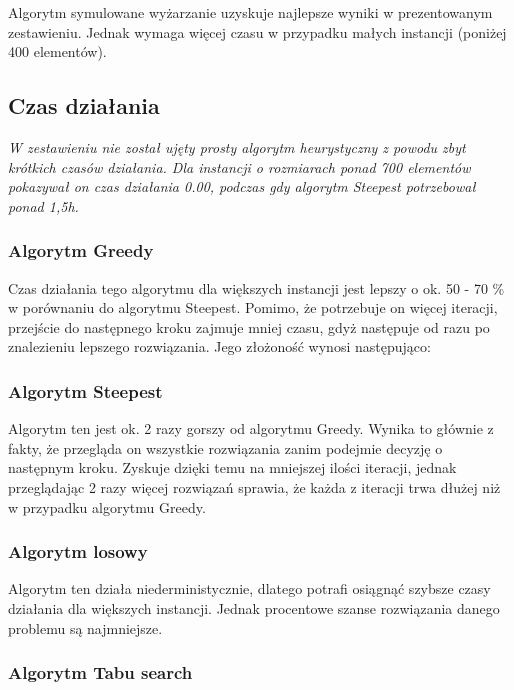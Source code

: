 Algorytm symulowane wyżarzanie uzyskuje najlepsze wyniki w prezentowanym zestawieniu. Jednak
wymaga więcej czasu w przypadku małych instancji (poniżej 400 elementów). 

\subsection{Czas działania}

\it
W zestawieniu nie został ujęty prosty algorytm heurystyczny z powodu zbyt krótkich czasów 
działania. Dla instancji o rozmiarach ponad 700 elementów pokazywał on czas działania 0.00, 
podczas gdy algorytm Steepest potrzebował ponad 1,5h.
\rm

\subsubsection{Algorytm Greedy}

Czas działania tego algorytmu dla większych instancji jest lepszy o ok. 50 - 70 \% w porównaniu 
do algorytmu Steepest. Pomimo, że potrzebuje on więcej iteracji, przejście do następnego kroku 
zajmuje mniej czasu, gdyż następuje od razu po znalezieniu lepszego rozwiązania. Jego złożoność 
wynosi następująco:

\subsubsection{Algorytm Steepest}

Algorytm ten jest ok. 2 razy gorszy od algorytmu Greedy. Wynika to głównie z fakty, że przegląda on
wszystkie rozwiązania zanim podejmie decyzję o następnym kroku. Zyskuje dzięki temu na mniejszej
ilości iteracji, jednak przeglądając 2 razy więcej rozwiązań sprawia, że każda z iteracji trwa 
dłużej niż w przypadku algorytmu Greedy.

\subsubsection{Algorytm losowy}

Algorytm ten działa niederministycznie, dlatego potrafi osiągnąć szybsze czasy działania dla 
większych instancji. Jednak procentowe szanse rozwiązania danego problemu są najmniejsze.

\subsubsection{Algorytm Tabu search}

